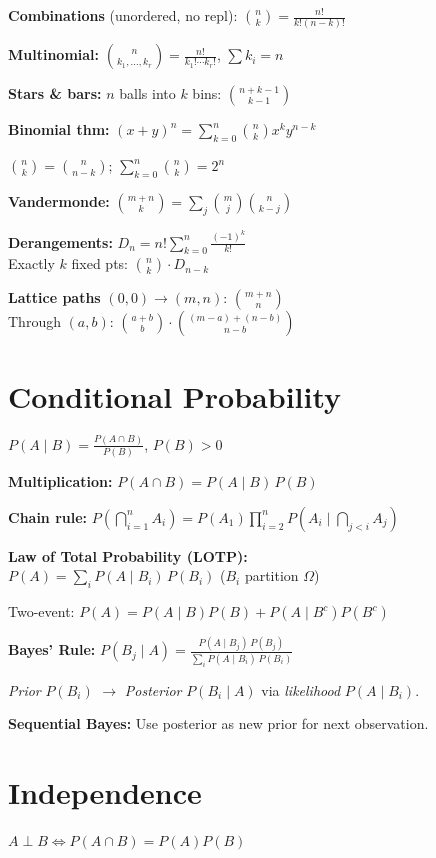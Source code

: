\documentclass[6pt]{article}
\newcommand{\hi}[1]{\colorbox{yellow!25}{\ensuremath{#1}}}
\begin{document}
\begin{multicols}{4}
\textbf{Combinations} (unordered, no repl): $\binom{n}{k}=\frac{n!}{k!(n-k)!}$

\textbf{Multinomial:} $\binom{n}{k_1,\ldots,k_r}=\frac{n!}{k_1!\cdots k_r!}$, $\sum k_i=n$

\textbf{Stars \& bars:} $n$ balls into $k$ bins: $\binom{n+k-1}{k-1}$

\textbf{Binomial thm:} $(x+y)^n = \sum_{k=0}^n \binom{n}{k}x^k y^{n-k}$

$\binom{n}{k}=\binom{n}{n-k}$;\; $\sum_{k=0}^n\binom{n}{k}=2^n$

\textbf{Vandermonde:} $\binom{m+n}{k}=\sum_j \binom{m}{j}\binom{n}{k-j}$

\textbf{Derangements:} $D_n = n!\sum_{k=0}^n \frac{(-1)^k}{k!}$\\
Exactly $k$ fixed pts: $\binom{n}{k}\cdot D_{n-k}$

\textbf{Lattice paths} $(0,0)\to(m,n)$: $\binom{m+n}{n}$\\
Through $(a,b)$: $\binom{a+b}{b}\cdot\binom{(m-a)+(n-b)}{n-b}$

\section{Conditional Probability}

\hi{P(A\mid B) = \frac{P(A\cap B)}{P(B)}}, \; $P(B)>0$

\textbf{Multiplication:} $P(A\cap B)=P(A\mid B)\,P(B)$

\textbf{Chain rule:} $P(\bigcap_{i=1}^n A_i) = P(A_1)\prod_{i=2}^n P(A_i\mid \bigcap_{j<i}A_j)$

\textbf{Law of Total Probability (LOTP):}\\
\hi{P(A)=\sum_i P(A\mid B_i)\,P(B_i)} \;($B_i$ partition $\Omega$)

Two-event: $P(A)=P(A\mid B)P(B)+P(A\mid B^c)P(B^c)$

\textbf{Bayes' Rule:}
\hi{P(B_j\mid A) = \frac{P(A\mid B_j)\,P(B_j)}{\sum_i P(A\mid B_i)\,P(B_i)}}

\textit{Prior} $P(B_i)$ $\to$ \textit{Posterior} $P(B_i\mid A)$ via \textit{likelihood} $P(A\mid B_i)$.

\textbf{Sequential Bayes:} Use posterior as new prior for next observation.

\section{Independence}

$A\perp B \iff P(A\cap B)=P(A)P(B)$


\end{multicols}
\end{document}

